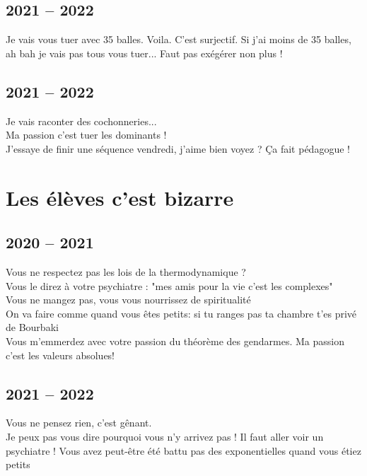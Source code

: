 \documentclass[french, a4paper, openany]{book}
\begin{document}
\section{2021 -- 2022}

	\noindent \og Je vais vous tuer avec 35 balles. Voila. C'est surjectif. Si j'ai moins de 35 balles, ah bah je vais pas tous vous tuer... Faut pas exégérer non plus ! \fg \\

\section{2021 -- 2022}

	\noindent \og Je vais raconter des cochonneries... \fg \\
	\og Ma passion c'est tuer les dominants ! \fg \\
	\og J'essaye de finir une séquence vendredi, j'aime bien voyez ? Ça fait pédagogue ! \fg \\

\chapter{Les élèves c'est bizarre}

\section{2020 -- 2021}

	\noindent \og Vous ne respectez pas les lois de la thermodynamique ? \fg \\
	\og Vous le direz à votre psychiatre : "mes amis pour la vie c'est les complexes" \fg \\
	\og Vous ne mangez pas, vous vous nourrissez de spiritualité \fg \\
	\og On va faire comme quand vous êtes petits: si tu ranges pas ta chambre t'es privé de Bourbaki \fg \\
	\og Vous m'emmerdez avec votre passion du théorème des gendarmes. Ma passion c'est les valeurs absolues! \fg \\

\section{2021 -- 2022}

	\noindent \og Vous ne pensez rien, c'est gênant. \fg \\
	\og Je peux pas vous dire pourquoi vous n'y arrivez pas ! Il faut aller voir un psychiatre ! Vous avez peut-être été battu pas des exponentielles quand vous étiez petits \fg \\
 
\end{document}
